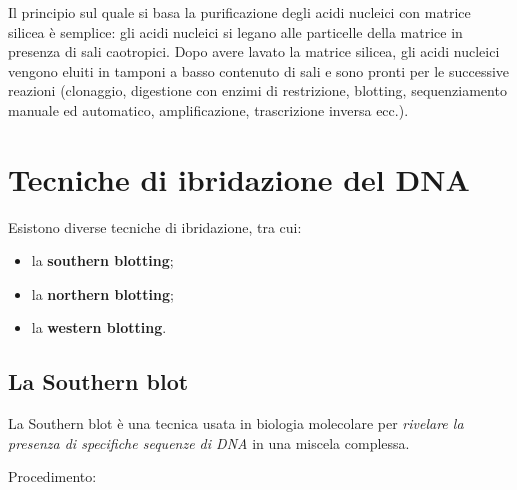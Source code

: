 \documentclass[11pt]{book}
\begin{document}
Il principio sul quale si basa la purificazione degli acidi nucleici con
matrice silicea è semplice: gli acidi nucleici si legano alle particelle
della matrice in presenza di sali caotropici. Dopo avere lavato la
matrice silicea, gli acidi nucleici vengono eluiti in tamponi a basso
contenuto di sali e sono pronti per le successive reazioni (clonaggio,
digestione con enzimi di restrizione, blotting, sequenziamento manuale
ed automatico, amplificazione, trascrizione inversa ecc.).

\section{Tecniche di ibridazione del
DNA}\label{tecniche-di-ibridazione-del-dna}

Esistono diverse tecniche di ibridazione, tra cui:

\begin{itemize}
\itemsep1pt\parskip0pt
\item
  la \textbf{southern blotting};
\item
  la \textbf{northern blotting};
\item
  la \textbf{western blotting}.
\end{itemize}

\subsection{La Southern blot}\label{la-southern-blot}

La Southern blot è una tecnica usata in biologia molecolare per
\emph{rivelare la presenza di specifiche sequenze di DNA} in una miscela
complessa.

Procedimento:
\end{document}
